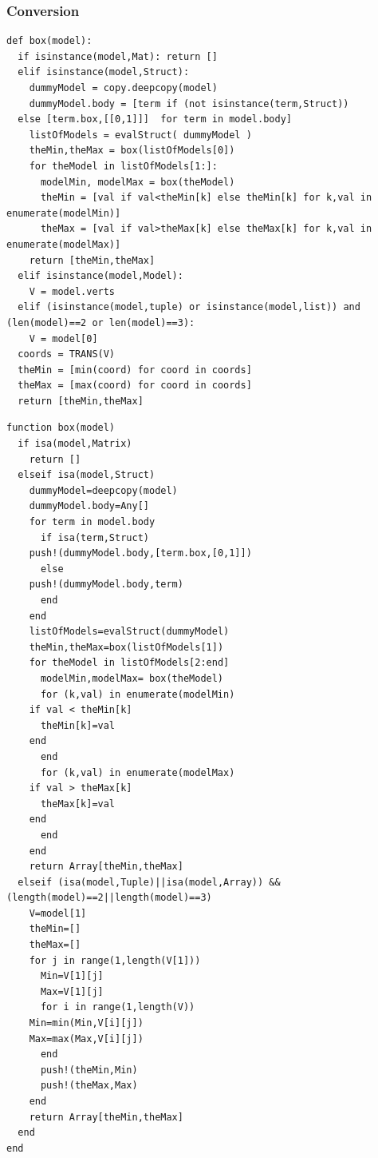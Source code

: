 \documentclass[a4paper,12pt]{article}
\begin{document}
\subsubsection{Conversion}
\begin{Verbatim}[fontsize=\footnotesize]
def box(model):
  if isinstance(model,Mat): return []
  elif isinstance(model,Struct):
    dummyModel = copy.deepcopy(model)
    dummyModel.body = [term if (not isinstance(term,Struct))
  else [term.box,[[0,1]]]  for term in model.body]
    listOfModels = evalStruct( dummyModel )
    theMin,theMax = box(listOfModels[0])
    for theModel in listOfModels[1:]:
      modelMin, modelMax = box(theModel)
      theMin = [val if val<theMin[k] else theMin[k] for k,val in enumerate(modelMin)]
      theMax = [val if val>theMax[k] else theMax[k] for k,val in enumerate(modelMax)]
    return [theMin,theMax]
  elif isinstance(model,Model):
    V = model.verts
  elif (isinstance(model,tuple) or isinstance(model,list)) and (len(model)==2 or len(model)==3):
    V = model[0]
  coords = TRANS(V)
  theMin = [min(coord) for coord in coords]
  theMax = [max(coord) for coord in coords]
  return [theMin,theMax]
\end{Verbatim}
\begin{Verbatim}[fontsize=\footnotesize]
function box(model)
  if isa(model,Matrix)
    return []
  elseif isa(model,Struct)
    dummyModel=deepcopy(model)
    dummyModel.body=Any[]
    for term in model.body
      if isa(term,Struct)
	push!(dummyModel.body,[term.box,[0,1]])
      else
	push!(dummyModel.body,term)
      end
    end
    listOfModels=evalStruct(dummyModel)
    theMin,theMax=box(listOfModels[1])
    for theModel in listOfModels[2:end]
      modelMin,modelMax= box(theModel)
      for (k,val) in enumerate(modelMin)
	if val < theMin[k]
	  theMin[k]=val
	end
      end
      for (k,val) in enumerate(modelMax)
	if val > theMax[k]
	  theMax[k]=val
	end
      end
    end
    return Array[theMin,theMax]
  elseif (isa(model,Tuple)||isa(model,Array)) &&(length(model)==2||length(model)==3)
    V=model[1]
    theMin=[]
    theMax=[]
    for j in range(1,length(V[1]))
      Min=V[1][j]
      Max=V[1][j]
      for i in range(1,length(V))
	Min=min(Min,V[i][j])
	Max=max(Max,V[i][j])
      end
      push!(theMin,Min)
      push!(theMax,Max)
    end
    return Array[theMin,theMax]
  end
end
\end{Verbatim}
\end{document}
